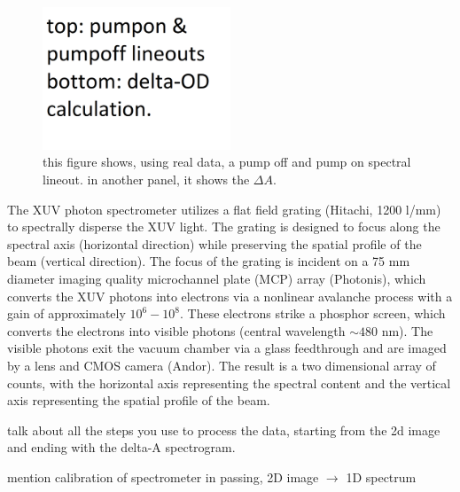 \begin{figure}
	\centering
	\includegraphics[width=0.5\textwidth]{figures/chap3/PumpOn_vs_PumpOff.png}
	\caption{this figure shows, using real data, a pump off and pump on spectral lineout. in another panel, it shows the $\Delta A$.}
	\label{fig:PumpOn_vs_PumpOff}
\end{figure}

The XUV photon spectrometer utilizes a flat field grating (Hitachi, 1200 l/mm) to spectrally disperse the XUV light. The grating is designed to focus along the spectral axis (horizontal direction) while preserving the spatial profile of the beam (vertical direction). The focus of the grating is incident on a 75 mm diameter imaging quality microchannel plate (MCP) array (Photonis), which converts the XUV photons into electrons via a nonlinear avalanche process with a gain of approximately $10^6 - 10^8$. These electrons strike a phosphor screen, which converts the electrons into visible photons (central wavelength $\sim480$ nm). The visible photons exit the vacuum chamber via a glass feedthrough and are imaged by a lens and CMOS camera (Andor). The result is a two dimensional array of counts, with the horizontal axis representing the spectral content and the vertical axis representing the spatial profile of the beam.

talk about all the steps you use to process the data, starting from the 2d image and ending with the delta-A spectrogram.

mention calibration of spectrometer in passing, 2D image $\rightarrow$ 1D spectrum


